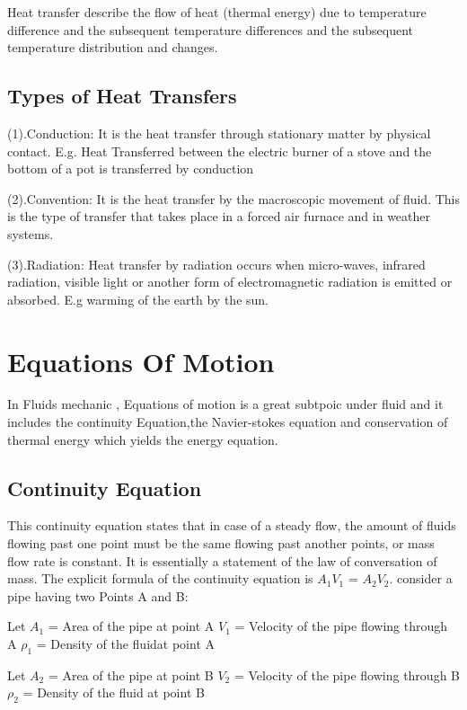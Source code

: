 \documentclass[a4paper, 12pt]{report}
\begin{document}
Heat transfer describe the flow of heat (thermal energy) due to temperature difference and the subsequent temperature differences and the subsequent temperature distribution and changes.


\subsection{Types of Heat Transfers}
(1).Conduction: It is the heat transfer through stationary matter by physical contact. E.g. Heat Transferred between the electric burner of a stove and the bottom of a pot is transferred by conduction

(2).Convention: It is the heat transfer by the macroscopic movement of fluid. This is the type of transfer that takes place in a forced air furnace and in weather systems.

(3).Radiation: Heat transfer by radiation occurs when micro-waves, infrared radiation, visible light or another form of electromagnetic radiation is emitted or absorbed. E.g warming of the earth by the sun.

\section{Equations Of Motion}
In Fluids mechanic , Equations of motion is a great subtpoic under fluid and it includes  the continuity Equation,the Navier-stokes equation and conservation of thermal energy  which yields the energy equation.
\subsection{Continuity Equation}
This continuity equation states that in case of a steady flow, the amount of fluids flowing past one point must be the same flowing past another points, or mass flow rate is constant. 
It is essentially a statement of the law of conversation of mass. 
The explicit formula of the continuity equation is
		$A_1V_1$ = $A_2V_2$.\newline
		consider a pipe  having two Points A and B:
		
		Let $A_1$ = Area of the pipe at point A\newline
		$V_1$ = Velocity of the pipe flowing through A\newline
		$\rho_1$ = Density of the fluidat point A \newline
		
		Let $A_2$ = Area of the pipe at point B \newline
		$V_2$ = Velocity of the pipe flowing through B\newline
		$\rho_2$ = Density of the fluid at point B \newline
		
\end{document}
